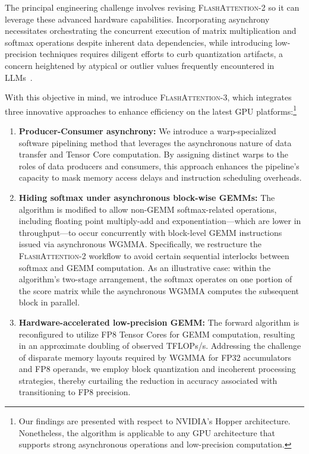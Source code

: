 The principal engineering challenge involves revising \textsc{FlashAttention-2} so it can leverage these advanced hardware capabilities. Incorporating asynchrony necessitates orchestrating the concurrent execution of matrix multiplication and softmax operations despite inherent data dependencies, while introducing low-precision techniques requires diligent efforts to curb quantization artifacts, a concern heightened by atypical or outlier values frequently encountered in LLMs~\citep{dettmers2208llm, sun2024massive}.

With this objective in mind, we introduce \textsc{FlashAttention-3}, which integrates three innovative approaches to enhance efficiency on the latest GPU platforms:\footnote{Our findings are presented with respect to NVIDIA's Hopper architecture. Nonetheless, the algorithm is applicable to any GPU architecture that supports strong asynchronous operations and low-precision computation.}

\begin{enumerate}

\item \textbf{Producer-Consumer asynchrony:} We introduce a warp-specialized software pipelining method that leverages the asynchronous nature of data transfer and Tensor Core computation. By assigning distinct warps to the roles of data producers and consumers, this approach enhances the pipeline's capacity to mask memory access delays and instruction scheduling overheads.
\item \textbf{Hiding softmax under asynchronous block-wise GEMMs:} The algorithm is modified to allow non-GEMM softmax-related operations, including floating point multiply-add and exponentiation—which are lower in throughput—to occur concurrently with block-level GEMM instructions issued via asynchronous WGMMA. Specifically, we restructure the \textsc{FlashAttention-2} workflow to avoid certain sequential interlocks between softmax and GEMM computation. As an illustrative case: within the algorithm's two-stage arrangement, the softmax operates on one portion of the score matrix while the asynchronous WGMMA computes the subsequent block in parallel.
\item \textbf{Hardware-accelerated low-precision GEMM:} The forward algorithm is reconfigured to utilize FP8 Tensor Cores for GEMM computation, resulting in an approximate doubling of observed TFLOPs/s. Addressing the challenge of disparate memory layouts required by WGMMA for FP32 accumulators and FP8 operands, we employ block quantization and incoherent processing strategies, thereby curtailing the reduction in accuracy associated with transitioning to FP8 precision.
\end{enumerate}


